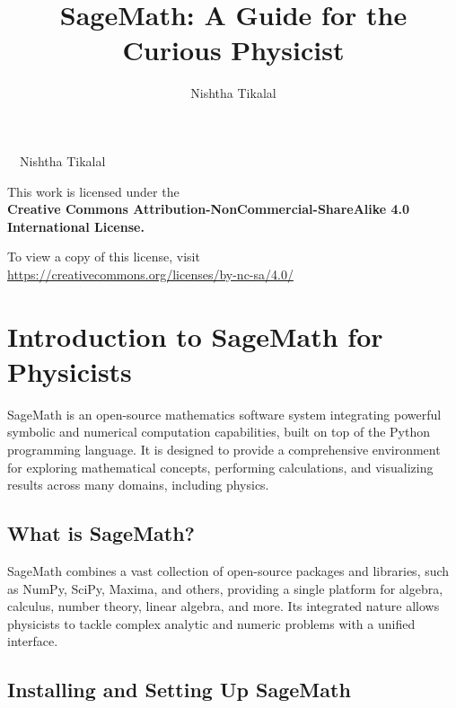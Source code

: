 \documentclass[12pt]{book}
\title{SageMath: A Guide for the Curious Physicist}
\author{Nishtha Tikalal}
\date{} %
\begin{document}
\frontmatter
\maketitle
\cleardoublepage
\thispagestyle{empty}
\vspace*{\fill}

\begin{center}
    \textcopyright\ \the\year\ Nishtha Tikalal

    \vspace{1em}

    This work is licensed under the\\
    \textbf{Creative Commons Attribution-NonCommercial-ShareAlike 4.0 International License.}

    \vspace{1em}

    To view a copy of this license, visit\\
    \url{https://creativecommons.org/licenses/by-nc-sa/4.0/}
\end{center}

\vspace*{\fill}
\cleardoublepage
\tableofcontents

\mainmatter

\chapter{Introduction to SageMath for Physicists}

SageMath is an open-source mathematics software system integrating powerful symbolic and numerical computation capabilities, built on top of the Python programming language. It is designed to provide a comprehensive environment for exploring mathematical concepts, performing calculations, and visualizing results across many domains, including physics.

\section{What is SageMath?}

SageMath combines a vast collection of open-source packages and libraries, such as NumPy, SciPy, Maxima, and others, providing a single platform for algebra, calculus, number theory, linear algebra, and more. Its integrated nature allows physicists to tackle complex analytic and numeric problems with a unified interface.

\section{Installing and Setting Up SageMath}
\end{document}
